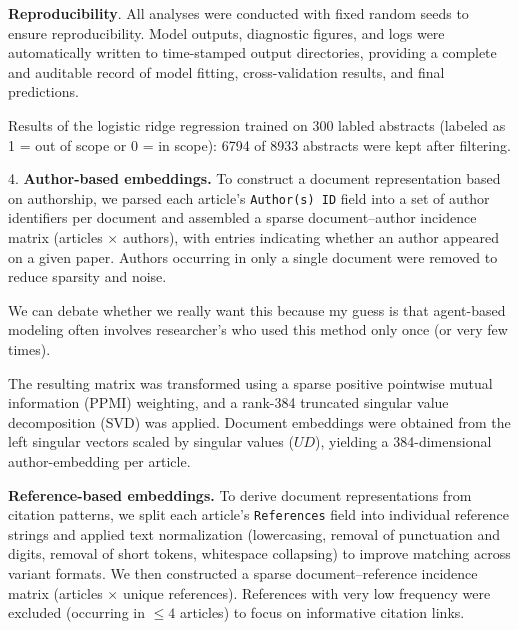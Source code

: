 \documentclass[pdflatex,sn-mathphys-num]{sn-jnl}%
\theoremstyle{thmstyleone}%
\theoremstyle{thmstyletwo}%
\theoremstyle{thmstylethree}%
\begin{document}
\textbf{Reproducibility}.
All analyses were conducted with fixed random seeds to ensure reproducibility. Model outputs, diagnostic figures, and logs were automatically written to time-stamped output directories, providing a complete and auditable record of model fitting, cross-validation results, and final predictions.

\vspace{0.70em}

Results of the logistic ridge regression trained on 300 labled abstracts (labeled as 1 = out of scope or 0 = in scope): 6794 of 8933 abstracts were kept after filtering. 

\vspace{1em}

{\Large 4.} \textbf{Author-based embeddings.}
To construct a document representation based on authorship, we parsed each article’s \texttt{Author(s) ID} field into a set of author identifiers per document and assembled a sparse document--author incidence matrix (articles $\times$ authors), with entries indicating whether an author appeared on a given paper. Authors occurring in only a single document were removed to reduce sparsity and noise.

\vspace{1em}
We can debate whether we really want this because my guess is that agent-based modeling often involves researcher's who used this method only once (or very few times).
\vspace{1em}

The resulting matrix was transformed using a sparse positive pointwise mutual information (PPMI) weighting, and a rank-384 truncated singular value decomposition (SVD) was applied. Document embeddings were obtained from the left singular vectors scaled by singular values ($U D$), yielding a 384-dimensional author-embedding per article.

\vspace{1em}

\textbf{Reference-based embeddings.}
To derive document representations from citation patterns, we split each article’s \texttt{References} field into individual reference strings and applied text normalization (lowercasing, removal of punctuation and digits, removal of short tokens, whitespace collapsing) to improve matching across variant formats. We then constructed a sparse document--reference incidence matrix (articles $\times$ unique references). References with very low frequency were excluded (occurring in $\leq 4$ articles) to focus on informative citation links.
\end{document}
